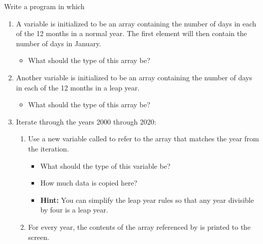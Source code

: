 Write a program in which
\begin{enumerate}
  \item A variable is initialized to be an array containing the number of days in each of the 12 months in a normal year. The first element will then contain the number of days in January.
    \begin{itemize}
      \item What should the type of this array be?
    \end{itemize}
  \item Another variable is initialized to be an array containing the number of days in each of the 12 months in a leap year.
    \begin{itemize}
      \item What should the type of this array be?
    \end{itemize}
  \item Iterate through the years 2000 through 2020:
    \begin{enumerate}
      \item Use a new variable called  to refer to the array that matches the year from the iteration.
        \begin{itemize}
          \item What should the type of this variable be?
          \item How much data is copied here?
          \item \textbf{Hint:} You can simplify the leap year rules so that any year divisible by four is a leap year.
        \end{itemize}
      \item For every year, the contents of the array referenced by  is printed to the screen.
  \end{enumerate}
\end{enumerate}

